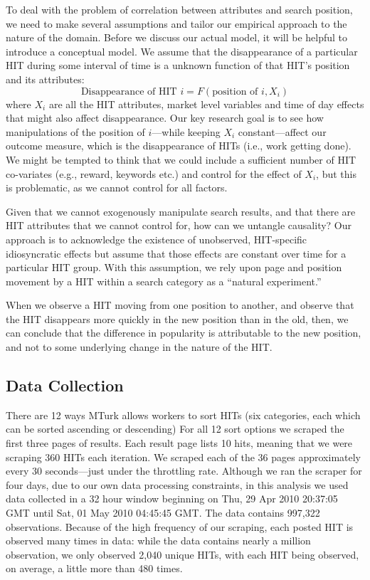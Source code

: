 \documentclass{acm_proc_article-sp}
\begin{document}
To deal with the problem of correlation between attributes and search
position, we need to make several assumptions and tailor our empirical
approach to the nature of the domain. Before we discuss our actual
model, it will be helpful to introduce a conceptual model. We assume
that the disappearance of a particular HIT during some interval of
time is a unknown function of that HIT's position and its attributes:
\[
\mbox{Disappearance of HIT $i$} = F(\mbox{position of $i$},X_i)
\]
where $X_i$ are all the HIT attributes, market level variables and
time of day effects that might also affect disappearance.  Our key
research goal is to see how manipulations of the position of
$i$---while keeping $X_i$ constant---affect our outcome measure, which
is the disappearance of HITs (i.e., work getting done). We might be
tempted to think that we could include a sufficient number of HIT
co-variates (e.g., reward, keywords etc.) and control for the effect of
$X_i$, but this is problematic, as we cannot control for all factors. 

Given that we cannot exogenously manipulate search results, and that
there are HIT attributes that we cannot control for, how can we
untangle causality? Our approach is to acknowledge the existence of
unobserved, HIT-specific idiosyncratic effects but assume that those
effects are constant over time for a particular HIT group. With this
assumption, we rely upon page and position movement by a HIT within a
search category as a ``natural experiment.''

When we observe a HIT moving from one position to another, and observe
that the HIT disappears more quickly in the new position than in the
old, then, we can conclude that the difference in popularity is
attributable to the new position, and not to some underlying change in
the nature of the HIT.

\subsection{Data Collection}
There are 12 ways MTurk allows workers to sort HITs (six categories,
each which can be sorted ascending or descending) For all 12 sort
options we scraped the first three pages of results.  Each result page
lists 10 hits, meaning that we were scraping 360 HITs each iteration.
We scraped each of the 36 pages approximately every 30 seconds---just
under the throttling rate. Although we ran the scraper for four days,
due to our own data processing constraints, in this analysis we used
data collected in a 32 hour window beginning on Thu, 29 Apr 2010
20:37:05 GMT until Sat, 01 May 2010 04:45:45 GMT. The data contains
997,322 observations. Because of the high frequency of our scraping,
each posted HIT is observed many times in data: while the data
contains nearly a million observation, we only observed 2,040 unique
HITs, with each HIT being observed, on average, a little more
than 480 times.
\end{document}
